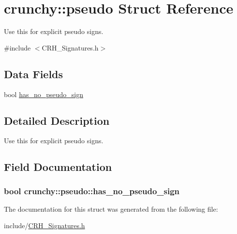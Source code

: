 \hypertarget{structcrunchy_1_1pseudo}{}\section{crunchy\+:\+:pseudo Struct Reference}
\label{structcrunchy_1_1pseudo}


Use this for explicit pseudo signs.  




{\ttfamily \#include $<$C\+R\+H\+\_\+\+Signatures.\+h$>$}

\subsection*{Data Fields}
\begin{DoxyCompactItemize}
\item 
bool \hyperlink{structcrunchy_1_1pseudo_a2ee9a07f78935a9382213249e98b43fb}{has\+\_\+no\+\_\+pseudo\+\_\+sign}
\end{DoxyCompactItemize}


\subsection{Detailed Description}
Use this for explicit pseudo signs. 

\subsection{Field Documentation}
\hypertarget{structcrunchy_1_1pseudo_a2ee9a07f78935a9382213249e98b43fb}{}
\subsubsection[{has\+\_\+no\+\_\+pseudo\+\_\+sign}]{\setlength{\rightskip}{0pt plus 5cm}bool crunchy\+::pseudo\+::has\+\_\+no\+\_\+pseudo\+\_\+sign}\label{structcrunchy_1_1pseudo_a2ee9a07f78935a9382213249e98b43fb}


The documentation for this struct was generated from the following file\+:\begin{DoxyCompactItemize}
\item 
include/\hyperlink{_c_r_h___signatures_8h}{C\+R\+H\+\_\+\+Signatures.\+h}\end{DoxyCompactItemize}
